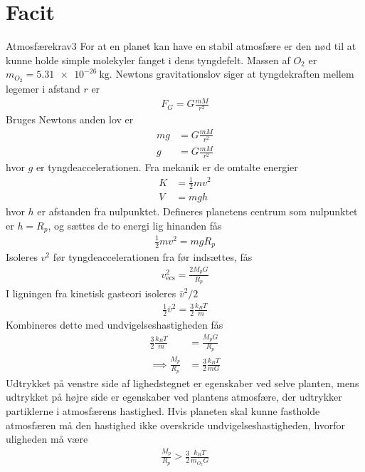 \newpage\newpage
\setcounter{opgave}{0}

\section{Facit}
\begin{opgave}{Atmosfærekrav}{3}
For at en planet kan have en stabil atmosfære er den nød til at kunne holde simple molekyler fanget i dens tyngdefelt. Massen af $O_2$ er $m_{O_2} = \SI{5,31e-26}{\kilo\gram}$.
\opg Newtons gravitationslov siger at tyngdekraften mellem legemer i afstand $r$ er
\begin{align*}
	F_G = G\frac{mM}{r^2}
\end{align*}
Bruges Newtons anden lov er
\begin{align*}
	mg &= G\frac{mM}{r^2} \\
	g &= G\frac{mM}{r^2}
\end{align*}
hvor $g$ er tyngdeaccelerationen.
\opg Fra mekanik er de omtalte energier
\begin{align*}
	K &= \frac{1}{2}mv^2 \\
	V &= mgh
\end{align*}
hvor $h$ er afstanden fra nulpunktet. Defineres planetens centrum som nulpunktet er $h = R_p$, og sættes de to energi lig hinanden fås
\begin{align*}
	\frac{1}{2}mv^2 = mgR_p
\end{align*}
Isoleres $v^2$ før tyngdeaccelerationen fra før indsættes, fås
\begin{align*}
	v_\mathrm{ecs}^2 = \frac{2M_pG}{R_p}
\end{align*}
\opg I ligningen fra kinetisk gasteori isoleres $\bar{v}^2/2$
\begin{align*}
	\frac{1}{2}\bar{v}^2 = \frac{3}{2}\frac{k_BT}{m}
\end{align*}
Kombineres dette med undvigelseshastigheden fås
\begin{align*}
	\frac{3}{2}\frac{k_BT}{m} &= \frac{M_pG}{R_p} \\
	\implies \frac{M_p}{R_p} &= \frac{3}{2}\frac{k_BT}{mG}
\end{align*}
\opg Udtrykket på venstre side af lighedstegnet er egenskaber ved selve planten, mens udtrykket på højre side er egenskaber ved plantens atmosfære, der udtrykker partiklerne i atmosfærens hastighed. Hvis planeten skal kunne fastholde atmosfæren må den hastighed ikke overskride undvigelseshastigheden, hvorfor uligheden må være
\begin{align}
	\frac{M_p}{R_p} > \frac{3}{2}\frac{k_BT}{m_{O_2}G}

\end{align}
\end{opgave}
